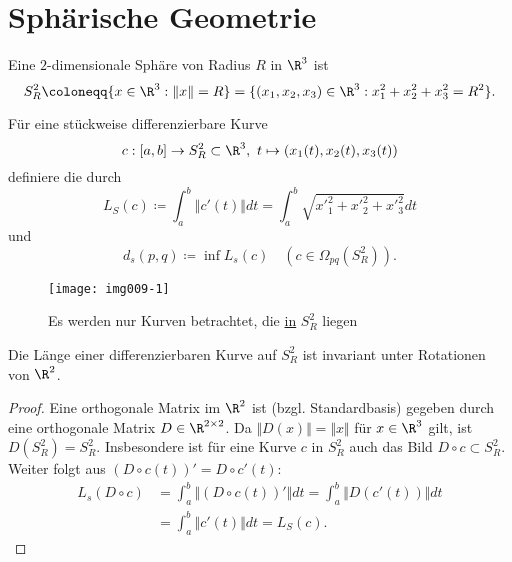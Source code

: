 \section{Sphärische Geometrie}
\begin{example}
  Eine $ 2 $-dimensionale Sphäre von Radius $ R $ in $ \R^3 $ ist
  \begin{equation*}
    S^2_R \coloneqq \{ x \in \R^3 : \Vert x \Vert = R \} = \{ (x_1, x_2, x_3) \in \R^3 : x_1^2+x_2^2+x_3^2 = R^2 \}\text{.}
  \end{equation*}
  \begin{minipage}{.65\textwidth}
  Für eine stückweise differenzierbare Kurve
    \begin{equation*}
      c: [a,b] \to S^2_R \subset \R^3, \ t \mapsto (x_1(t), x_2(t), x_3(t))
    \end{equation*}
    definiere die  durch
    \begin{equation*}
      L_S(c) \coloneqq \int_a^b \Vert c'(t) \Vert dt = \int_a^b \sqrt{{x'}_1^2+{x'}_2^2+{x'}_3^2}dt
    \end{equation*}
    und
    \begin{equation*}
      d_s(p,q) \coloneqq \inf L_s(c) \quad (c \in \Omega_{pq}(S^2_R))\text{.}
    \end{equation*}
  \end{minipage}
  \hfill
  \begin{minipage}{.25\textwidth}
    \begin{figure}[H]
      \label{img009-1}
      \texttt{[image: img009-1]}
      \caption{Es werden nur Kurven betrachtet, die \underline{in} $ S_R^2 $ liegen}
    \end{figure}
  \end{minipage}
\end{example}

\begin{lemma}
  \label{lemma:kurvenlaengen}
  Die Länge einer differenzierbaren Kurve auf $ S^2_R $ ist invariant unter Rotationen von $ \R^2 $.
  \begin{proof}
    Eine orthogonale Matrix im $ \R^2 $ ist (bzgl. Standardbasis) gegeben durch eine orthogonale Matrix $ D \in \R^{2 \times 2} $. Da $ \Vert D(x) \Vert = \Vert x \Vert $ für $ x \in \R^3 $ gilt, ist $ D(S^2_R) = S^2_R $. Insbesondere ist für eine Kurve $ c $ in $ S^2_R $ auch das Bild $ D \circ c \subset S^2_R $. \\
    Weiter folgt aus $ (D \circ c(t))' = D \circ c'(t) $:
    \begin{align*}
      L_s(D \circ c) &= \int_a^b \Vert (D \circ c(t))' \Vert dt = \int_a^b \Vert D(c'(t)) \Vert dt \\
        &= \int_a^b \Vert c'(t) \Vert dt = L_S(c)\text{.}
    \end{align*}
  \end{proof}
\end{lemma}

